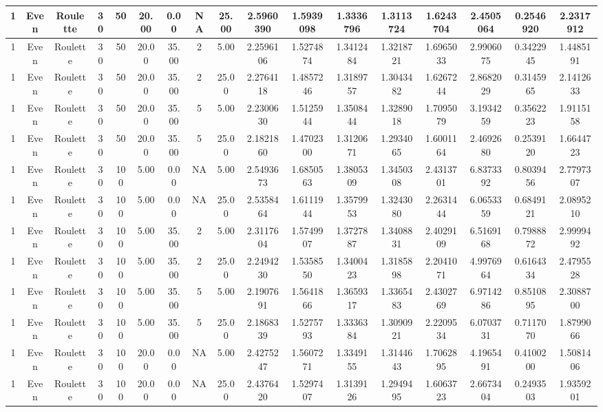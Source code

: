 \documentclass[a4paper]{article}
\begin{document}
\begin{center}
\begin{tabular}{ | c | c | c | c | c | c | c | c | c | c | c | c | c | c | c | c | c | }
		\hline
		1	&	Even	&	Roulette	&	30	&	50	&	20.00	&	0.00	&	NA	&	25.00	&	2.5960390	&	1.5939098	&	1.3336796	&	1.3113724	&	1.6243704	&	2.4505064	&	0.2546920	&	2.2317912 \\
		\hline
		1	&	Even	&	Roulette	&	30	&	50	&	20.00	&	35.00	&	2	&	5.00	&	2.2596106	&	1.5274874	&	1.3412484	&	1.3218721	&	1.6965033	&	2.9906075	&	0.3422945	&	1.4485191 \\
		\hline
		1	&	Even	&	Roulette	&	30	&	50	&	20.00	&	35.00	&	2	&	25.00	&	2.2764118	&	1.4857246	&	1.3189757	&	1.3043482	&	1.6267244	&	2.8682029	&	0.3145965	&	2.1412633 \\
		\hline
		1	&	Even	&	Roulette	&	30	&	50	&	20.00	&	35.00	&	5	&	5.00	&	2.2300630	&	1.5125944	&	1.3508444	&	1.3289018	&	1.7095079	&	3.1934259	&	0.3562223	&	1.9115158 \\
		\hline
		1	&	Even	&	Roulette	&	30	&	50	&	20.00	&	35.00	&	5	&	25.00	&	2.1821860	&	1.4702300	&	1.3120671	&	1.2934065	&	1.6001164	&	2.4692680	&	0.2539120	&	1.6644723 \\
		\hline
		1	&	Even	&	Roulette	&	30	&	100	&	5.00	&	0.00	&	NA	&	5.00	&	2.5493673	&	1.6850563	&	1.3805309	&	1.3450308	&	2.4313701	&	6.8373392	&	0.8039456	&	2.7797307 \\
		\hline
		1	&	Even	&	Roulette	&	30	&	100	&	5.00	&	0.00	&	NA	&	25.00	&	2.5358464	&	1.6111944	&	1.3579953	&	1.3243080	&	2.2631444	&	6.0653359	&	0.6849121	&	2.0895210 \\
		\hline
		1	&	Even	&	Roulette	&	30	&	100	&	5.00	&	35.00	&	2	&	5.00	&	2.3117604	&	1.5749907	&	1.3727887	&	1.3408831	&	2.4029109	&	6.5169168	&	0.7988872	&	2.9999492 \\
		\hline
		1	&	Even	&	Roulette	&	30	&	100	&	5.00	&	35.00	&	2	&	25.00	&	2.2494230	&	1.5358550	&	1.3400423	&	1.3185898	&	2.2041071	&	4.9976964	&	0.6164334	&	2.4795528 \\
		\hline
		1	&	Even	&	Roulette	&	30	&	100	&	5.00	&	35.00	&	5	&	5.00	&	2.1907691	&	1.5641866	&	1.3659317	&	1.3365483	&	2.4302769	&	6.9714286	&	0.8510895	&	2.3088700 \\
		\hline
		1	&	Even	&	Roulette	&	30	&	100	&	5.00	&	35.00	&	5	&	25.00	&	2.1868339	&	1.5275793	&	1.3336384	&	1.3090921	&	2.2209534	&	6.0703731	&	0.7117070	&	1.8799066 \\
		\hline
		1	&	Even	&	Roulette	&	30	&	100	&	20.00	&	0.00	&	NA	&	5.00	&	2.4275247	&	1.5607271	&	1.3349155	&	1.3144643	&	1.7062895	&	4.1965491	&	0.4100200	&	1.5081406 \\
		\hline
		1	&	Even	&	Roulette	&	30	&	100	&	20.00	&	0.00	&	NA	&	25.00	&	2.4376420	&	1.5297407	&	1.3139126	&	1.2949495	&	1.6063723	&	2.6673404	&	0.2493503	&	1.9359201 \\

\end{tabular}
\end{center}
\end{document}
